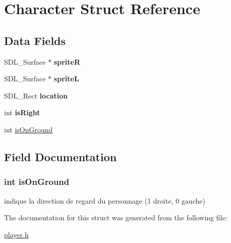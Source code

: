 \hypertarget{struct_character}{\section{Character Struct Reference}
\label{struct_character}
}
\subsection*{Data Fields}
\begin{DoxyCompactItemize}
\item 
\hypertarget{struct_character_a4186e172249b67c908a4439f239c1de9}{S\-D\-L\-\_\-\-Surface $\ast$ {\bfseries sprite\-R}}\label{struct_character_a4186e172249b67c908a4439f239c1de9}

\item 
\hypertarget{struct_character_a73edf76e7b33bc324df0c1a576bf20ab}{S\-D\-L\-\_\-\-Surface $\ast$ {\bfseries sprite\-L}}\label{struct_character_a73edf76e7b33bc324df0c1a576bf20ab}

\item 
\hypertarget{struct_character_a08e7ab1c2395b84bea7ca13eb99bac60}{S\-D\-L\-\_\-\-Rect {\bfseries location}}\label{struct_character_a08e7ab1c2395b84bea7ca13eb99bac60}

\item 
\hypertarget{struct_character_ac73a92163fd55152d03d0aaca5093b72}{int {\bfseries is\-Right}}\label{struct_character_ac73a92163fd55152d03d0aaca5093b72}

\item 
int \hyperlink{struct_character_aa4061d19d285d0ef281f333dee8f9a00}{is\-On\-Ground}
\end{DoxyCompactItemize}


\subsection{Field Documentation}
\hypertarget{struct_character_aa4061d19d285d0ef281f333dee8f9a00}{
\subsubsection[{is\-On\-Ground}]{\setlength{\rightskip}{0pt plus 5cm}int is\-On\-Ground}}\label{struct_character_aa4061d19d285d0ef281f333dee8f9a00}
indique la direction de regard du personnage (1 droite, 0 gauche) 

The documentation for this struct was generated from the following file\-:\begin{DoxyCompactItemize}
\item 
\hyperlink{player_8h}{player.\-h}\end{DoxyCompactItemize}
